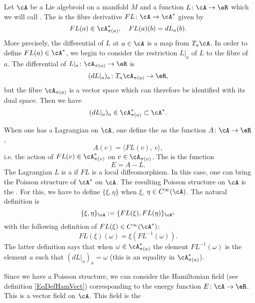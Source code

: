 Let $\cA$ be a Lie algebroid on a manifold $M$ and a function $L\colon \cA\to \eR$ which we will call . The  is the fibre derivative $FL\colon \cA\to \cA^*$ given by
\begin{equation}
FL(a)\in\cA^*_{\pi(a)},\quad FL(a)(b)=dL_{a}(b).
\end{equation}
More precisely, the differential of $L$ at $a\in \cA$ is a map from $T_{a}\cA$. In order to define $FL(a)\in\cA^*$, we begin to consider the restriction $L|_{a}$ of $L$ to the fibre of $a$. The differential of $L|_{a}\colon \cA_{\pi(a)}\to \eR$ is
\[
  (dL|_{a})_{a}\colon T_{a}\cA_{\pi(a)}\to \eR,
\]
 but the fibre $\cA_{\pi(a)}$ is a vector space which can therefore be identified with its dual space. Then we have
\[
  (dL|_{a})_{a}\in\cA^*_{\pi(a)}\subset\cA^*.
\]

When one has a Lagrangian on $\cA$, one define the  as the function $A\colon \cA\to \eR$,
\begin{equation}
   A(v)=\langle FL(v),\,v\rangle,
\end{equation}
i.e. the action of $FL(v)\in\cA^*_{\pi(v)}$ on $v\in\cA_{\pi(v)}$. The  is the function
\[
  E=A-L.
\]
The Lagrangian $L$ is a  if $FL$ is a local diffeomorphism. In this case, one can bring the Poisson structure of $\cA^*$ on $\cA$. The resulting Poisson structure on $\cA$ is the . For this, we have to define $\{ \xi,\eta \}$ when $\xi$, $\eta\in C^{\infty}(\cA)$. The natural definition is
\begin{equation}
\{ \xi,\eta \}_{\cA}:=\{ FL(\xi),FL(\eta) \}_{\cA^*}
\end{equation}
with the following definition of $FL(\xi)\in  C^{\infty}(\cA^*)$:
\begin{equation}
FL(\xi)(\omega)=\xi(FL^{-1}(\omega)).
\end{equation}
The latter definition says that when $\omega\in\cA^*_{\pi(a)}$ the element $FL^{-1}(\omega)$ is the element $a$ such that $(dL|_{a})_{a}=\omega$ (this is an equality in $\cA^*_{\pi(a)}$).

Since we have a Poisson structure, we can consider the Hamiltonian field (see definition \eqref{EqDefHamVect}) corresponding to the energy function $E\colon \cA\to \eR$. This is a vector field on $\cA$. This field is the 

